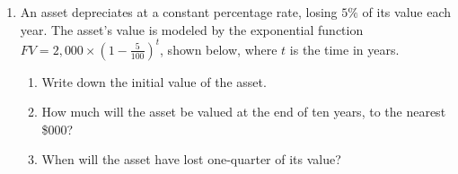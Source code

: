 \documentclass[12pt, twoside]{article}
\begin{document}
\begin{enumerate}
\begin{multicols}{2}
\begin{center}
    \end{center}
    \end{multicols}

\newpage
\item An asset depreciates at a constant percentage rate, losing $5\%$ of its value each year. The asset's value is modeled by the exponential function $\displaystyle FV=2,000 \times \left( 1-\frac{5}{100} \right)^t$, shown below, where $t$ is the time in years.
\begin{multicols}{2}
    \begin{enumerate}[itemsep=1cm]
        \item Write down the initial value of the asset.
        \item How much will the asset be valued at the end of ten years, to the nearest \$000?
        \item When will the asset have lost one-quarter of its value?
    \end{enumerate}
    \begin{center}
    \end{center}
    \end{multicols}


\end{enumerate}
\end{document}
